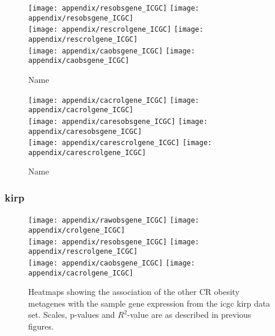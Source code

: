 \begin{appendices}
	\begin{figure}[htpb]
		\ContinuedFloat
		\captionsetup{list=off,format=cont}
		\centering
		\texttt{[image: appendix/resobsgene\_ICGC]}
		\hfill
		\texttt{[image: appendix/resobsgene\_ICGC]}\\
		\texttt{[image: appendix/rescrolgene\_ICGC]}
		\hfill
		\texttt{[image: appendix/rescrolgene\_ICGC]}\\
		\texttt{[image: appendix/caobsgene\_ICGC]}
		\hfill
		\texttt{[image: appendix/caobsgene\_ICGC]}\\
		\caption{Name}
	\end{figure}

	\begin{figure}[htpb]
		\ContinuedFloat
		\captionsetup{list=off,format=cont}
		\centering
		\texttt{[image: appendix/cacrolgene\_ICGC]}
		\hfill
		\texttt{[image: appendix/cacrolgene\_ICGC]}\\
		\texttt{[image: appendix/caresobsgene\_ICGC]}
		\hfill
		\texttt{[image: appendix/caresobsgene\_ICGC]}\\
		\texttt{[image: appendix/carescrolgene\_ICGC]}
		\hfill
		\texttt{[image: appendix/carescrolgene\_ICGC]}\\
		\caption{Name}
	\end{figure}

	\newpage

	\subsubsection{\gls{kirp}}
	\label{ssub:kirp}
	
	\begin{figure}[htp!]
		\centering
		\texttt{[image: appendix/rawobsgene\_ICGC]}
		\hfill
		\texttt{[image: appendix/crolgene\_ICGC]}\\
		\texttt{[image: appendix/resobsgene\_ICGC]}
		\hfill
		\texttt{[image: appendix/rescrolgene\_ICGC]}\\
		\texttt{[image: appendix/caobsgene\_ICGC]}
		\hfill
		\texttt{[image: appendix/cacrolgene\_ICGC]}\\
		\caption{Heatmaps showing the association of the other CR obesity metagenes with the sample gene expression from the \gls{icgc} \gls{kirp} data set.
		Scales, p-values and $R^2$-value are as described in previous figures.}
		\label{fig:degmetaicgc_kirp}
	\end{figure}


\end{appendices}
